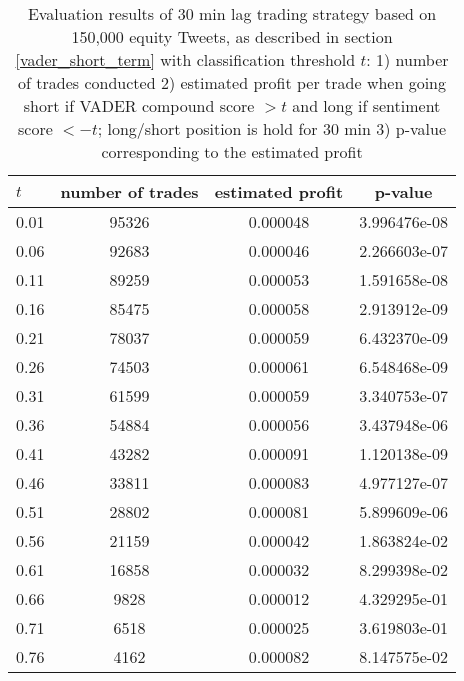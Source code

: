 \documentclass[a4paper,12pt]{article}%
\begin{document}
\begin{table}[H]
\centering
\captionsetup{justification=centering}
\begin{tabular}{l|ccc}
$t$ &  number of trades &  estimated profit & p-value\\
\hline
0.01 &           95326 &      0.000048 &  3.996476e-08 \\
0.06 &           92683 &      0.000046 &  2.266603e-07 \\
0.11 &           89259 &      0.000053 &  1.591658e-08 \\
0.16 &           85475 &      0.000058 &  2.913912e-09 \\
0.21 &           78037 &      0.000059 &  6.432370e-09 \\
0.26 &           74503 &      0.000061 &  6.548468e-09 \\
0.31 &           61599 &      0.000059 &  3.340753e-07 \\
0.36 &           54884 &      0.000056 &  3.437948e-06 \\
0.41 &           43282 &      0.000091 &  1.120138e-09 \\
0.46 &           33811 &      0.000083 &  4.977127e-07 \\
0.51 &           28802 &      0.000081 &  5.899609e-06 \\
0.56 &           21159 &      0.000042 &  1.863824e-02 \\
0.61 &           16858 &      0.000032 &  8.299398e-02 \\
0.66 &            9828 &      0.000012 &  4.329295e-01 \\
0.71 &            6518 &      0.000025 &  3.619803e-01 \\
0.76 &            4162 &      0.000082 &  8.147575e-02 \\
\end{tabular}
\caption{Evaluation results of 30 min lag trading strategy based on 150,000 equity Tweets, as described in section \ref{vader_short_term} with classification threshold $t$: 1) number of trades conducted
2) estimated profit per trade when going short if VADER compound score $>t$ and long if sentiment score $< -t$; long/short position is hold for 30 min 3) p-value corresponding to the estimated profit\label{append_vader_short_term_30min}}
\end{table}
\end{document}
